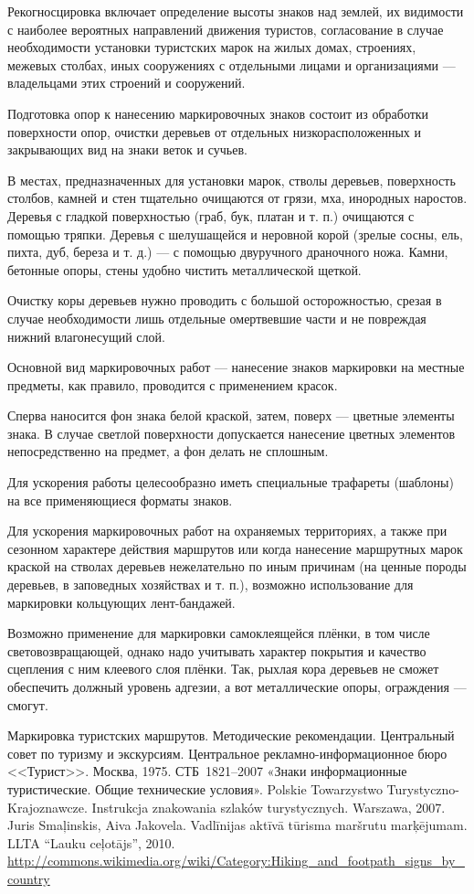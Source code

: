 \documentclass[a5paper,10pt,titlepage]{extarticle}
\begin{document}
Рекогносцировка включает определение высоты знаков над землей, их видимости с наиболее вероятных направлений движения
туристов, согласование в случае необходимости установки туристских марок на жилых домах, строениях, межевых столбах,
иных сооружениях с отдельными лицами и организациями --- владельцами этих строений и сооружений.

Подготовка опор к нанесению маркировочных знаков состоит из обработки поверхности опор, очистки деревьев от отдельных
низкорасположенных и закрывающих вид на знаки веток и сучьев.

В местах, предназначенных для установки марок, стволы деревьев, поверхность столбов, камней и стен тщательно
очищаются от грязи, мха, инородных наростов. Деревья с гладкой поверхностью (граб, бук, платан и т. п.) очищаются с
помощью тряпки. Деревья с шелушащейся и неровной корой (зрелые сосны, ель, пихта, дуб, береза и т. д.) --- с помощью
двуручного драночного ножа. Камни, бетонные опоры, стены удобно чистить металлической щеткой.

Очистку коры деревьев нужно проводить с большой осторожностью, срезая в случае необходимости лишь отдельные омертвевшие
части и не повреждая нижний влагонесущий слой.

Основной вид маркировочных работ --- нанесение знаков маркировки на местные предметы, как правило, проводится с
применением красок.

Сперва наносится фон знака белой краской, затем, поверх --- цветные элементы знака. В случае светлой поверхности
допускается нанесение цветных элементов непосредственно на предмет, а фон делать не сплошным.

Для ускорения работы целесообразно иметь специальные трафареты (шаблоны) на все
применяющиеся форматы знаков.

Для ускорения маркировочных работ на охраняемых территориях, а также при сезонном характере действия маршрутов или когда
нанесение маршрутных марок краской на стволах деревьев нежелательно по иным причинам (на ценные породы деревьев, в
заповедных хозяйствах и т. п.), возможно использование для маркировки кольцующих лент-бандажей.

Возможно применение для маркировки самоклеящейся плёнки, в том числе световозвращающей, однако надо учитывать характер
покрытия и качество сцепления с ним клеевого слоя плёнки. Так, рыхлая кора деревьев не сможет обеспечить должный
уровень адгезии, а вот металлические опоры, ограждения --- смогут.

\begin{thebibliography}{99}
	 Маркировка туристских маршрутов. Методические рекомендации. Центральный совет по туризму и
		экскурсиям. Центральное рекламно-информационное бюро <<Турист>>. Москва, 1975.
	 СТБ~1821--2007 «Знаки информационные туристические. Общие технические условия».
	 Polskie Towarzystwo Turystyczno-Krajoznawcze. Instrukcja znakowania szlaków turystycznych. Warszawa, 2007.
	 Juris Smaļinskis, Aiva Jakovela. Vadlīnijas aktīvā tūrisma maršrutu marķējumam. LLTA “Lauku ceļotājs”, 2010.
	 \url{http://commons.wikimedia.org/wiki/Category:Hiking\_and\_footpath\_signs\_by\_country}

\end{thebibliography}
\end{document}
